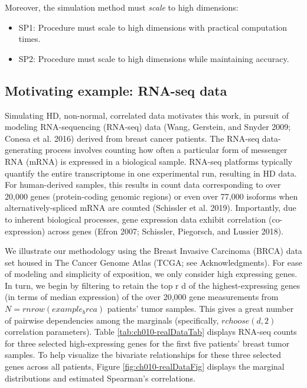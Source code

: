 \documentclass{article}
\begin{document}
Moreover, the simulation method must \emph{scale} to high dimensions:

\begin{itemize}
\tightlist
\item
  SP1: Procedure must scale to high dimensions with practical
  computation times.
\item
  SP2: Procedure must scale to high dimensions while maintaining
  accuracy.
\end{itemize}

\hypertarget{motivating-example-rna-seq-data}{%
\subsection{Motivating example: RNA-seq
data}\label{motivating-example-rna-seq-data}}

Simulating HD, non-normal, correlated data motivates this work, in
pursuit of modeling RNA-sequencing (RNA-seq) data (Wang, Gerstein, and
Snyder 2009; Conesa et al. 2016) derived from breast cancer patients.
The RNA-seq data-generating process involves counting how often a
particular form of messenger RNA (mRNA) is expressed in a biological
sample. RNA-seq platforms typically quantify the entire transcriptome in
one experimental run, resulting in HD data. For human-derived samples,
this results in count data corresponding to over 20,000 genes
(protein-coding genomic regions) or even over 77,000 isoforms when
alternatively-spliced mRNA are counted (Schissler et al. 2019).
Importantly, due to inherent biological processes, gene expression data
exhibit correlation (co-expression) across genes (Efron 2007; Schissler,
Piegorsch, and Lussier 2018).

We illustrate our methodology using the Breast Invasive Carcinoma (BRCA)
data set housed in The Cancer Genome Atlas (TCGA; see Acknowledgments).
For ease of modeling and simplicity of exposition, we only consider high
expressing genes. In turn, we begin by filtering to retain the top r d
of the highest-expressing genes (in terms of median expression) of the
over 20,000 gene measurements from \(N=r nrow(example_brca)\) patients'
tumor samples. This gives a great number of pairwise dependencies among
the marginals (specifically, \(r choose(d,2)\) correlation parameters).
Table \ref{tab:ch010-realDataTab} displays RNA-seq counts for three
selected high-expressing genes for the first five patients' breast tumor
samples. To help visualize the bivariate relationships for these three
selected genes across all patients, Figure \ref{fig:ch010-realDataFig}
displays the marginal distributions and estimated Spearman's
correlations.
\end{document}
